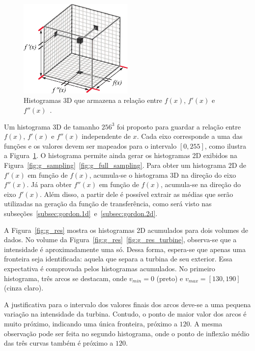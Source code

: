 \begin{figure}[b]
	\centering
	\includegraphics[width=0.5\textwidth]{images/g_histo3d}
	\caption{Histogramas 3D que armazena a relação entre $ f(x) $, $ f'(x) $ e $ f''(x) $~\cite{gordonms}.}
	\label{fig:g_histo3d}
\end{figure}
	
	Um histograma 3D de tamanho $ 256^{3} $ foi proposto para guardar a relação entre $ f(x) $, $ f'(x) $ e $ f''(x) $ independente de $x$. Cada eixo corresponde a uma das funções e os valores devem ser mapeados para o intervalo $ [0,255] $, como ilustra a Figura~\ref{fig:g_histo3d}. O histograma permite ainda gerar os histogramas 2D exibidos na Figura~\ref{fig:g_sampling}~\ref{fig:g_full_sampling}. Para obter um histograma 2D de $ f'(x) $ em função de $ f(x) $, acumula-se o histograma 3D na direção do eixo $ f''(x) $. Já para obter $ f''(x) $ em função de $ f(x) $, acumula-se na direção do eixo $ f'(x) $. Além disso, a partir dele é possível extrair as médias que serão utilizadas na geração da função de transferência, como será visto nas subseções~\ref{subsec:gordon.1d}~e~\ref{subsec:gordon.2d}.
	
	A Figura~\ref{fig:g_res} mostra os histogramas 2D acumulados para dois volumes de dados. No volume  da Figura~\ref{fig:g_res}~\ref{fig:g_res_turbine}, observa-se que a intensidade é aproximadamente uma só. Dessa forma, espera-se que apenas uma fronteira seja identificada: aquela que separa a turbina de seu exterior. Essa expectativa é comprovada pelos histogramas acumulados. No primeiro histograma, três arcos se destacam, onde $ v_{min} = 0 $ (preto) e $ v_{max} = [130,190] $ (cinza claro).
	
	A justificativa para o intervalo dos valores finais dos arcos deve-se a uma pequena variação na intensidade da turbina. Contudo, o ponto de maior valor dos arcos é muito próximo, indicando uma única fronteira, próximo a $ 120 $. A mesma observação pode ser feita no segundo histograma, onde o ponto de inflexão médio das três curvas também é próximo a $ 120 $.
	

